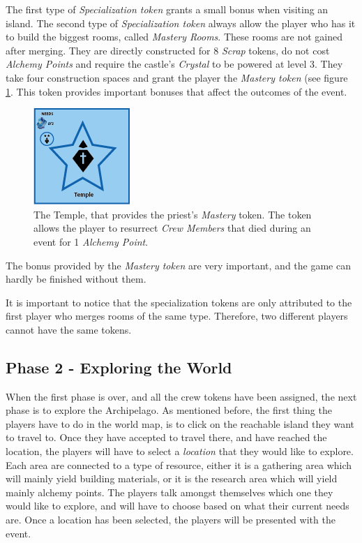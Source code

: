 The first type of \textit{Specialization token} grants a small bonus when visiting an island. The second type of \textit{Specialization token} always allow the player who has it to build the biggest rooms, called \textit{Mastery Rooms}. These rooms are not gained after merging. They are directly constructed for 8 \textit{Scrap} tokens, do not cost \textit{Alchemy Points} and require the castle's \textit{Crystal} to be powered at level 3. They take four construction spaces and grant the player the \textit{Mastery token} (see figure \ref{fig:temp}. This token provides important bonuses that affect the outcomes of the event.
 
\begin{figure}[!ht]
    \centering
    \includegraphics[scale=1]{Images/mastery.png}
    \caption{The Temple, that provides the priest's \textit{Mastery} token. The token allows the player to resurrect \textit{Crew Members} that died during an event for 1 \textit{Alchemy Point}.}
    \label{fig:temp}
\end{figure}

The bonus provided by the \textit{Mastery token} are very important, and the game can hardly be finished without them.

It is important to notice that the specialization tokens are only attributed to the first player who merges rooms of the same type. Therefore, two different players cannot have the same tokens.
\subsection{Phase 2 - Exploring the World}
\label{sec:p2}
When the first phase is over, and all the crew tokens have been assigned, the next phase is to explore the Archipelago.
As mentioned before, the first thing the players have to do in the world map, is to click on the reachable island they want to travel to. Once they have accepted to travel there, and have reached the location, the players will have to select a \textit{location} that they would like to explore.
Each area are connected to a type of resource, either it is a gathering area which will mainly yield building materials, or it is the research area which will yield mainly alchemy points. The players talk amongst themselves which one they would like to explore, and will have to choose based on what their current needs are. Once a location has been selected, the players will be presented with the event.

